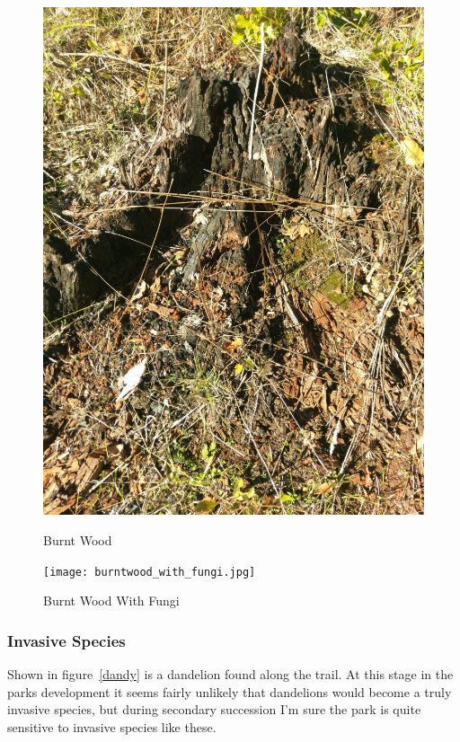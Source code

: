 \documentclass{article}
\begin{document}
\begin{figure}[H]
\centering{}
\caption{Burnt Wood}
\includegraphics[scale=0.05]{burntwood.jpg}
\label{}
\end{figure}

\begin{figure}[H]
\centering{}
\caption{Burnt Wood With Fungi}
\texttt{[image: burntwood\_with\_fungi.jpg]}
\label{}
\end{figure}
\newpage


\subsubsection{Invasive Species}\label{ssub:invasive_species}
Shown in figure~\ref{dandy} is a dandelion found along the trail. At this stage in the parks
development it seems fairly unlikely that dandelions would become a truly invasive
species, but during secondary succession I'm sure the park is quite sensitive to 
invasive species like these.
\end{document}
